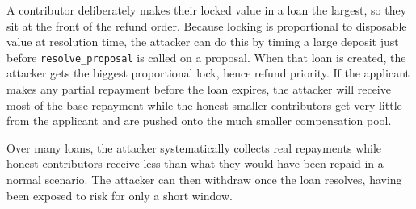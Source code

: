A contributor deliberately makes their locked value in a loan the largest, so they sit at the front of the refund order. Because locking is proportional to disposable value at resolution time, the attacker can do this by timing a large deposit just before \texttt{resolve\_proposal} is called on a proposal. When that loan is created, the attacker gets the biggest proportional lock, hence refund priority. If the applicant makes any partial repayment before the loan expires, the attacker will receive most of the base repayment while the honest smaller contributors get very little from the applicant and are pushed onto the much smaller compensation pool.

Over many loans, the attacker systematically collects real repayments while honest contributors receive less than what they would have been repaid in a normal scenario. The attacker can then withdraw once the loan resolves, having been exposed to risk for only a short window.

